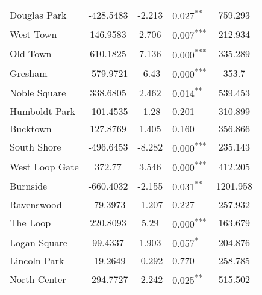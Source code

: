 \documentclass[12pt]{report}
\begin{document}
\begin{longtable}{l S[table-format=6.4] S[table-format=3.4] l S[table-format=4.4]}
	Douglas Park                 & -428.5483            & -2.213           & 0.027\textsuperscript{**}  & 759.293                           \\
	West Town                    & 146.9583             & 2.706            & 0.007\textsuperscript{***} & 212.934                           \\
	Old Town                     & 610.1825             & 7.136            & 0.000\textsuperscript{***} & 335.289                           \\
	Gresham                      & -579.9721            & -6.43            & 0.000\textsuperscript{***} & 353.7                             \\
	Noble Square                 & 338.6805             & 2.462            & 0.014\textsuperscript{**}  & 539.453                           \\
	Humboldt Park                & -101.4535            & -1.28            & 0.201                      & 310.899                           \\
	Bucktown                     & 127.8769             & 1.405            & 0.160                      & 356.866                           \\
	South Shore                  & -496.6453            & -8.282           & 0.000\textsuperscript{***} & 235.143                           \\
	West Loop Gate               & 372.77               & 3.546            & 0.000\textsuperscript{***} & 412.205                           \\
	Burnside                     & -660.4032            & -2.155           & 0.031\textsuperscript{**}  & 1201.958                          \\
	Ravenswood                   & -79.3973             & -1.207           & 0.227                      & 257.932                           \\
	The Loop                     & 220.8093             & 5.29             & 0.000\textsuperscript{***} & 163.679                           \\
	Logan Square                 & 99.4337              & 1.903            & 0.057\textsuperscript{*}   & 204.876                           \\
	Lincoln Park                 & -19.2649             & -0.292           & 0.770                      & 258.785                           \\
	North Center                 & -294.7727            & -2.242           & 0.025\textsuperscript{**}  & 515.502                           \\

\end{longtable}
\end{document}
